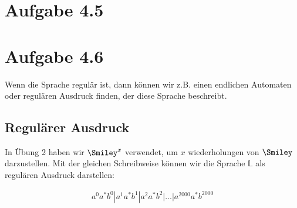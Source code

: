 \documentclass{article}
\begin{document}
\section*{Aufgabe 4.5}

\section*{Aufgabe 4.6}
Wenn die Sprache regulär ist, dann können wir z.B. einen endlichen Automaten oder regulären Ausdruck finden, der diese Sprache beschreibt.

\subsection*{Regulärer Ausdruck}
In Übung 2 haben wir $\Smiley^x$ verwendet, um $x$ wiederholungen von $\Smiley$ darzustellen. Mit der gleichen Schreibweise können wir die Sprache $\mathbb{L}$ als regulären Ausdruck darstellen:

\begin{align*}
a^0a^*b^0|a^1a^*b^1|a^2a^*b^2|...|a^{2000}a^*b^{2000}
\end{align*}
\end{document}
